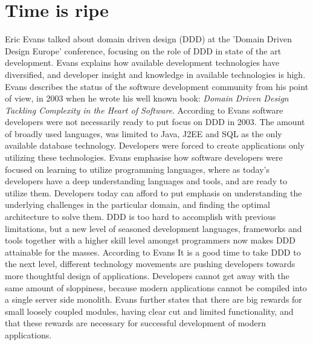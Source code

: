 \section{Time is ripe}
Eric Evans talked about domain driven design (DDD) at the 'Domain Driven Design Europe' conference\cite{evans2016tackling}, focusing on the role of DDD in state of the art development. Evans explains how available development technologies have diversified, and developer insight and knowledge in available technologies is high. Evans describes the status of the software development community from his point of view, in 2003 when he wrote his well known book: \textit{Domain Driven Design Tackling Complexity in the Heart of Software}\cite{evans2004domain}. According to Evans software developers were not necessarily ready to put focus on DDD in 2003. The amount of broadly used languages, was limited to Java, J2EE and SQL as the only available database technology. Developers were forced to create applications only utilizing these technologies. Evans emphasise how software developers were focused on learning to utilize programming languages, where as today's developers have a deep understanding languages and tools, and are ready to utilize them. Developers today can afford to put emphasis on understanding the underlying challenges in the particular domain, and finding the optimal architecture to solve them. DDD is too hard to accomplish with previous limitations, but a new level of seasoned development languages, frameworks and tools together with a higher skill level amongst programmers now makes DDD attainable for the masses. According to Evans It is a good time to take DDD to the next level, different technology movements are pushing developers towards more thoughtful design of applications. Developers cannot get away with the same amount of sloppiness, because modern applications cannot be compiled into a single server side monolith. Evans further states that there are big rewards for small loosely coupled modules, having clear cut and limited functionality, and that these rewards are necessary for successful development of modern applications.


